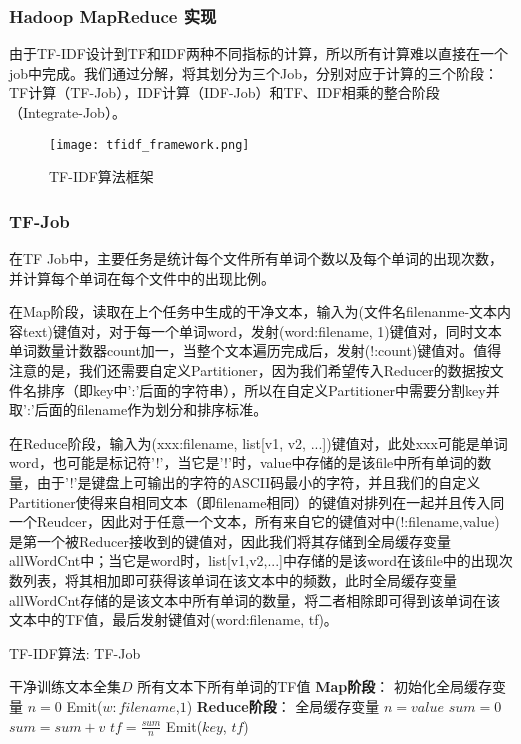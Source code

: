 \documentclass[lang=cn,11pt]{elegantpaper}
\begin{document}
\subsubsection{Hadoop MapReduce 实现}
由于TF-IDF设计到TF和IDF两种不同指标的计算，所以所有计算难以直接在一个job中完成。我们通过分解，将其划分为三个Job，分别对应于计算的三个阶段：TF计算（TF-Job），IDF计算（IDF-Job）和TF、IDF相乘的整合阶段（Integrate-Job）。

\begin{figure}[!htb]
	\centering
	\texttt{[image: tfidf\_framework.png]}
	\caption{TF-IDF算法框架 \label{fig:tfidf_framework}}
\end{figure}

\subsubsection{TF-Job}
在TF Job中，主要任务是统计每个文件所有单词个数以及每个单词的出现次数，并计算每个单词在每个文件中的出现比例。\par
在Map阶段，读取在上个任务中生成的干净文本，输入为(文件名filenanme-文本内容text)键值对，对于每一个单词word，发射(word:filename, 1)键值对，同时文本单词数量计数器count加一，当整个文本遍历完成后，发射(!:count)键值对。值得注意的是，我们还需要自定义Partitioner，因为我们希望传入Reducer的数据按文件名排序（即key中':'后面的字符串），所以在自定义Partitioner中需要分割key并取':'后面的filename作为划分和排序标准。\par
在Reduce阶段，输入为(xxx:filename, list[v1, v2, ...])键值对，此处xxx可能是单词word，也可能是标记符'!'，当它是'!'时，value中存储的是该file中所有单词的数量，由于'!'是键盘上可输出的字符的ASCII码最小的字符，并且我们的自定义Partitioner使得来自相同文本（即filename相同）的键值对排列在一起并且传入同一个Reudcer，因此对于任意一个文本，所有来自它的键值对中(!:filename,value)是第一个被Reducer接收到的键值对，因此我们将其存储到全局缓存变量allWordCnt中；当它是word时，list[v1,v2,...]中存储的是该word在该file中的出现次数列表，将其相加即可获得该单词在该文本中的频数，此时全局缓存变量allWordCnt存储的是该文本中所有单词的数量，将二者相除即可得到该单词在该文本中的TF值，最后发射键值对(word:filename, tf)。\par
\begin{algorithm}[!htb]
  \caption{TF-IDF算法: TF-Job}  
  \label{alg:Framwork}
  \begin{algorithmic}[1]
    \Require
    干净训练文本全集$D$
    \Ensure
    所有文本下所有单词的TF值
    \State \textbf{Map阶段}：
    \State 初始化全局缓存变量 $n=0$
    \EndFunction
        \State Emit($w:filename$,$1$)
      \EndFor
    \EndFunction
    \State \textbf{Reduce阶段}：
      \State 全局缓存变量 $n=value$
    \Else
      \State $sum=0$
        \State $sum = sum + v$
      \EndFor
      \State $tf = \frac{sum}{n}$
      \State Emit($key$, $tf$)
    \EndIf
    \EndFunction
  \end{algorithmic}
\end{algorithm}
\end{document}
